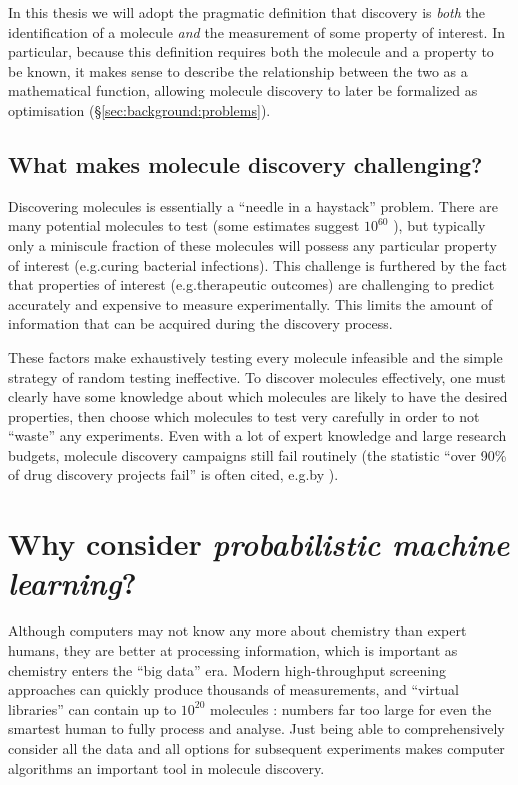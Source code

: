 In this thesis we will adopt the pragmatic definition that discovery is
\emph{both} the identification of a molecule \emph{and} the measurement of some property of interest.
In particular, because this definition requires both the molecule and a property to be known,
it makes sense to describe the relationship between the two as a mathematical function,
allowing molecule discovery to later be formalized as optimisation
(\S\ref{sec:background:problems}).

\subsection{What makes molecule discovery challenging?}

Discovering molecules is essentially a ``needle in a haystack'' problem.
There are many potential molecules to test (some estimates suggest $10^{60}$ \citep{bohacek1996art}),
but typically only a miniscule fraction of these molecules will possess any particular
property of interest (e.g.\@ curing bacterial infections).
This challenge is furthered by the fact that properties of interest
(e.g.\@ therapeutic outcomes)
are challenging to predict accurately and expensive to measure experimentally.
This limits the amount of information that can be acquired during the discovery process.

These factors make exhaustively testing every molecule infeasible
and the simple strategy of random testing ineffective.
To discover molecules effectively,
one must clearly have some knowledge about which molecules are likely to have the desired properties,
then choose which molecules to test very carefully in order to not ``waste'' any experiments.
Even with a lot of expert knowledge and large research budgets,
molecule discovery campaigns still fail routinely
(the statistic ``over 90\% of drug discovery projects fail'' is often cited,
e.g.\@ by \citet{hay2014clinical}).

\section{Why consider \emph{probabilistic machine learning}?}

Although computers may not know any more about chemistry than expert humans,
they are better at processing information, which is important as chemistry enters the ``big data'' era.
Modern high-throughput screening approaches can quickly produce thousands of measurements,
and ``virtual libraries'' can contain up to $10^{20}$ molecules \citep{hoffmann2019next}:
numbers far too large for even the smartest human to fully process and analyse.
Just being able to comprehensively consider all the data and all options for subsequent experiments
makes computer algorithms an important tool in molecule discovery.

